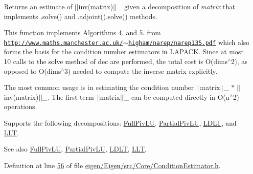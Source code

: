 \begin{DoxyReturn}{Returns}
an estimate of $\vert$$\vert$inv(matrix)$\vert$$\vert$\+\_ given a decomposition of {\itshape matrix} that implements .solve() and .adjoint().solve() methods.
\end{DoxyReturn}
This function implements Algorithms 4. and 5. from \href{http://www.maths.manchester.ac.uk/~higham/narep/narep135.pdf}{\tt http\+://www.\+maths.\+manchester.\+ac.\+uk/$\sim$higham/narep/narep135.\+pdf} which also forms the basis for the condition number estimators in L\+A\+P\+A\+CK. Since at most 10 calls to the solve method of dec are performed, the total cost is O(dims$^\wedge$2), as opposed to O(dims$^\wedge$3) needed to compute the inverse matrix explicitly.

The most common usage is in estimating the condition number $\vert$$\vert$matrix$\vert$$\vert$\+\_ $\ast$ $\vert$$\vert$inv(matrix)$\vert$$\vert$\+\_. The first term $\vert$$\vert$matrix$\vert$$\vert$\+\_ can be computed directly in O(n$^\wedge$2) operations.

Supports the following decompositions\+: \hyperlink{group___l_u___module_class_eigen_1_1_full_piv_l_u}{Full\+Piv\+LU}, \hyperlink{group___l_u___module_class_eigen_1_1_partial_piv_l_u}{Partial\+Piv\+LU}, \hyperlink{group___cholesky___module_class_eigen_1_1_l_d_l_t}{L\+D\+LT}, and \hyperlink{group___cholesky___module_class_eigen_1_1_l_l_t}{L\+LT}.

\begin{DoxySeeAlso}{See also}
\hyperlink{group___l_u___module_class_eigen_1_1_full_piv_l_u}{Full\+Piv\+LU}, \hyperlink{group___l_u___module_class_eigen_1_1_partial_piv_l_u}{Partial\+Piv\+LU}, \hyperlink{group___cholesky___module_class_eigen_1_1_l_d_l_t}{L\+D\+LT}, \hyperlink{group___cholesky___module_class_eigen_1_1_l_l_t}{L\+LT}. 
\end{DoxySeeAlso}


Definition at line \hyperlink{eigen_2_eigen_2src_2_core_2_condition_estimator_8h_source_l00056}{56} of file \hyperlink{eigen_2_eigen_2src_2_core_2_condition_estimator_8h_source}{eigen/\+Eigen/src/\+Core/\+Condition\+Estimator.\+h}.

\mbox{\label{namespace_eigen_1_1internal_afe2a11c61eff70f7f68681a557fa21e7}} 
